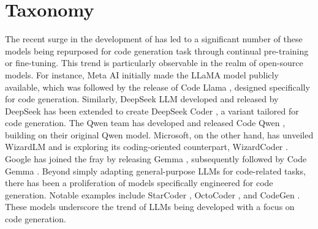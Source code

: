 \section{Taxonomy}\label{sec:taxonomy}
The recent surge in the development of  has led to a significant number of these models being repurposed for code generation task through continual pre-training or fine-tuning. 
This trend is particularly observable in the realm of open-source models. 
For instance, Meta AI initially made the LLaMA \cite{touvron2023llama} model publicly available, which was followed by the release of Code Llama \cite{roziere2023code}, designed specifically for code generation. 
Similarly, DeepSeek LLM \cite{bi2024deepseek} developed and released by DeepSeek has been extended to create DeepSeek Coder \cite{guo2024deepseek}, a variant tailored for code generation. 
The Qwen team has developed and released Code Qwen \cite{codeqwen}, building on their original Qwen \cite{bai2023qwen} model. 
Microsoft, on the other hand, has unveiled WizardLM \cite{xu2023wizardlm} and is exploring its coding-oriented counterpart, WizardCoder \cite{luo2023wizardcoder}. 
Google has joined the fray by releasing Gemma \cite{team2024gemma}, subsequently followed by Code Gemma \cite{codegemma_2024}.
Beyond simply adapting general-purpose LLMs for code-related tasks, there has been a proliferation of models specifically engineered for code generation. Notable examples include StarCoder \cite{li2023starcoder}, OctoCoder \cite{muennighoff2023octopack}, and CodeGen \cite{nijkamp2022codegen}. These models underscore the trend of LLMs being developed with a focus on code generation.

